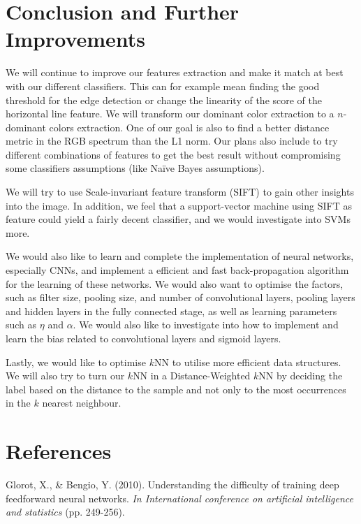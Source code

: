 \documentclass{article} %
\begin{document}
\section{Conclusion and Further Improvements}
We will continue to improve our features extraction and make it match at best with our different classifiers. This can for example mean finding the good threshold for the edge detection or change the linearity of the score of the horizontal line feature. We will transform our dominant color extraction to a $n$-dominant colors extraction. One of our goal is also to find a better distance metric in the RGB spectrum than the L1 norm. Our plans also include to try different combinations of features to get the best result without compromising some classifiers assumptions (like Na\"ive Bayes assumptions).

We will try to use Scale-invariant feature transform (SIFT) to gain other insights into the image. In addition, we feel that a support-vector machine using SIFT as feature could yield a fairly decent classifier, and we would investigate into SVMs more.

We would also like to learn and complete the implementation of neural networks, especially CNNs, and implement a efficient and fast back-propagation algorithm for the learning of these networks. We would also want to optimise the factors, such as filter size, pooling size, and number of convolutional layers, pooling layers and hidden layers in the fully connected stage, as well as learning parameters such as $\eta$ and $\alpha$. We would also like to investigate into how to implement and learn the bias related to convolutional layers and sigmoid layers.

Lastly, we would like to optimise $k$NN to utilise more efficient data structures. We will also try to turn our $k$NN in a Distance-Weighted $k$NN by deciding the label based on the distance to the sample and not only to the most occurrences in the $k$ nearest neighbour.



\section{References}
\small{
Glorot, X., \& Bengio, Y. (2010). Understanding the difficulty of training deep feedforward neural networks. \textit{In International conference on artificial intelligence and statistics} (pp. 249-256).
}
\end{document}
